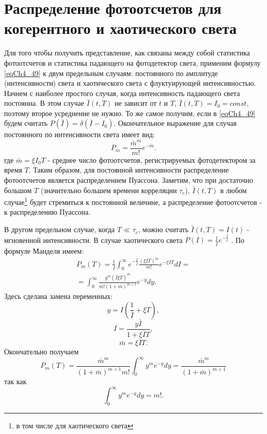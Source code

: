 \section{Распределение фотоотсчетов для когерентного и хаотического
  света}
Для того чтобы получить представление, как связаны между собой
статистика фотоотсчетов и статистика падающего на фотодетектор света,
применим формулу \eqref{eqCh4_49} к двум предельным случаям:
постоянного по амплитуде (интенсивности) света и хаотического света с
флуктуирующей 
интенсивностью. Начнем с наиболее простого случая, когда интенсивность падающего
света постоянна. В этом случае $\bar{I}\left(t, T\right)$ не зависит
от $t$ и $T$, $\bar{I}\left(t, T\right) = I_0 = const$,  поэтому  
второе усреднение не нужно. То же самое получим, если в
\eqref{eqCh4_49} будем считать $P\left(\bar{I}\right) =
\delta\left(\bar{I} - I_0\right)$.  Окончательное выражение для случая 
постоянного по интенсивности света имеет вид: 
\begin{equation}
P_m = \frac{\bar{m}^m}{m!}e^{- \bar{m}}.
\label{eqCh4_50}
\end{equation}
где $\bar{m} = \xi I_0 T$ - среднее число фотоотсчетов, регистрируемых
фотодетектором за время $T$.  Таким образом, для постоянной
интенсивности распределение фотоотсчетов является распределением
Пуассона. 
Заметим, что при достаточно большом $T$ (значительно большем
времени корреляции $\tau_c$), $\bar{I}\left(t, T\right)$  в любом
случае\footnote{в том числе для хаотического света}  будет стремиться к
постоянной величине, а распределение фотоотсчетов - к распределению
Пуассона. 
  
В другом предельном случае, когда $T \ll \tau_c$,  можно считать
$\bar{I}\left(t, T\right) = I\left(t\right)$ - мгновенной
интенсивности. В случае хаотического света $P\left(I\right) =
\frac{1}{\bar{I}} e^{- \frac{I}{\bar{I}}}$ \cite{bLoudon1976}.  
По формуле Манделя имеем:
\begin{eqnarray}
P_m\left(T\right) = \frac{1}{\bar{I}}\int_0^{\infty} e^{- \frac{I}{\bar{I}}}
\frac{\left(\xi I T\right)^m}{m!} e^{-
  \xi I T} d I = 
\nonumber \\
= \int_0^{\infty} \frac{y^m\left(\bar{I} \xi
  T\right)^m}{m!\left(1 + \bar{m}\right)^{m + 1}} e^{-y} dy.
\label{eqCh4_51}
\end{eqnarray}
Здесь сделана замена переменных:
\[
y = I \left(\frac{1}{\bar{I}} + \xi T\right),
\]
\[
I = \frac{y \bar{I}}{1 + \xi \bar{I} T},
\]
\[
\bar{m} = \xi \bar{I} T.
\]
Окончательно получаем
\begin{equation}
P_m\left(T\right) = 
\frac{\bar{m}^m}{\left(1 + \bar{m}\right)^{m + 1} m!}
\int_0^{\infty}y^m e^{-y}dy = 
\frac{\bar{m}^m}{\left(1 + \bar{m}\right)^{m + 1}}
\label{eqCh4_52}
\end{equation}
так как
\[
\int_0^{\infty}y^m e^{-y}dy = m!.
\]

